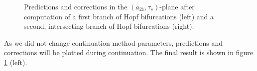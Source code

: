\documentclass[10pt]{article}
\begin{document}
{\begin{figure}[h]
\begin{center}
\end{center}
\caption{\small\label{ride6_pic}Predictions and corrections
in the $(a_{21},\tau_s)$-plane after computation of a first
branch of Hopf bifurcations (left) and a second, intersecting
branch of Hopf bifurcations (right).} 
\end{figure}
As we did not change continuation method parameters,
predictions and corrections will be plotted during continuation.
The final result is shown in figure \ref{ride6_pic} (left).
}
\end{document}
